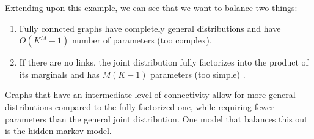     Extending upon this example, we can see that we want to balance two things: 
    \begin{enumerate} 
      \item Fully conncted graphs have completely general distributions and have $O(K^M -1)$ number of parameters (too complex). 
      \item If there are no links, the joint distribution fully factorizes into the product of its marginals and has $M(K-1)$ parameters (too simple) . 
    \end{enumerate}
    Graphs that have an intermediate level of connectivity allow for more general distributions compared to the fully factorized one, while requiring fewer parameters than the general joint distribution. One model that balances this out is the hidden markov model. 

